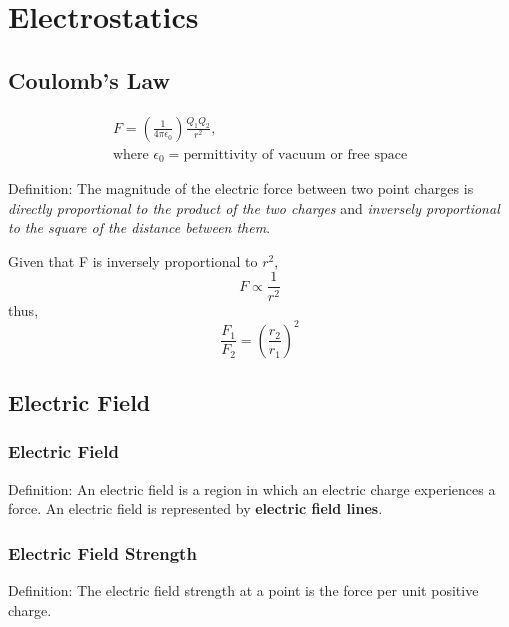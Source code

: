 \documentclass[../../../main.tex]{subfiles}
\begin{document}
\setcounter{chapter}{11}
\chapter{Electrostatics}

\section{Coulomb's Law}

\begin{gather*}
    F=(\frac{1}{4\pi\epsilon_0})\frac{Q_1Q_2}{r^2}, \\
    \text{where } \epsilon_0= \text{permittivity of vacuum or free space}
\end{gather*}

\begin{mdframed}
    Definition: The magnitude of the electric force between two point charges is \emph{directly proportional to the product of the two charges} and \emph{inversely proportional to the square of the distance between them}.
\end{mdframed}
Given that F is inversely proportional to \(r^2\),
\begin{equation}
    F \propto \frac{1}{r^2}
\end{equation}
thus,
\begin{equation}
    \frac{F_1}{F_2}=(\frac{r_2}{r_1})^2
\end{equation}

\section{Electric Field}

\subsection{Electric Field}
\begin{mdframed}
    Definition: An electric field is a region in which an electric charge experiences a force. An electric field is represented by \textbf{electric field lines}.
\end{mdframed}

\subsection{Electric Field Strength}
\begin{mdframed}
    Definition: The electric field strength at a point is the force per unit positive charge.
\end{mdframed}
\end{document}
